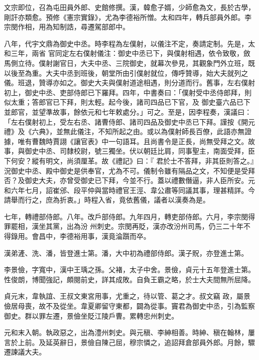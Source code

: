 \begin{pinyinscope}
 文宗即位，召為屯田員外郎、史館修撰。漢，韓愈子婿，少師愈為文，長於古學，剛訐亦類愈。預修《憲宗實錄》，尤為李德裕所憎。太和四年，轉兵部員外郎。李宗閔作相，用為知制誥，尋遷駕部郎中。



 八年，代宇文鼎為御史中丞。時李程為左僕射，以儀注不定，奏請定制。先是，太和三年，兩省
 官同定左右僕射儀注：御史中丞已下，與僕射相遇，依令致敬，斂馬側立待。僕射謝官日，大夫中丞、三院御史，就幕次參見，其觀象門外立班，既以後至為重。大夫中丞到班後，朝堂所由引僕射就位，傳呼贊導，始大夫就列之儀。班退，贊導亦如之。御史大夫與僕射道途相遇，則分道而行。舊事，左右僕射初上，御史中丞、吏部侍郎已下羅拜。四年，中書奏曰：「僕射受中丞侍郎拜，則似太重；答郎官已下拜，則太輕。起今後，諸司四品已下官，及
 御史臺六品已下並郎官，並望準故事，餘依元和七年敕處分。」可之。至是，因李程奏，漢議曰：「左右僕射初上，受左右丞、諸曹侍郎、諸司四品及御史中丞已下拜。謹按《開元禮》及《六典》，並無此儀注，不知所起之由。或以為僕射師長百僚，此語亦無證據，唯有曹魏時賈詡《讓官表》中一句語耳。且尚書令是正長，尚無受拜之文。故事，與御史中丞、司隸校尉，號三獨坐。伏以朝廷比肩，同事聖主，南面受拜，臣下何安？縱有明文，尚須厘革。故《禮記》曰：『
 君於士不答拜，非其臣則答之。』況御史中丞、殿中御史是供奉官，尤為不可。儀制令雖有隔品之文，不知便是受拜否？及御史大夫，亦曾受御史已下拜，今並不行。蓋以禮數僭逼，非人臣所安。元和六年七月，詔崔邠、段平仲與當時禮官王涇、韋公肅等同議其事，理甚精詳。今請舉而行之，庶為折衷。」時程入省，竟依舊儀，議者以漢奏為是。



 七年，轉禮部侍郎。八年。改戶部侍郎。九年四月，轉吏部侍郎。六月，李宗閔得罪罷相，漢坐其黨，出為汾
 州刺史。宗閔再貶，漢亦改汾州司馬，仍三二十年不得錄用。會昌中，李德裕用事，漢竟淪躓而卒。



 漢弟滻、洗、潘，皆登進士第。潘，大中初為禮部侍郎。漢子貺，亦登進士第。



 李景儉，字寬中，漢中王瑀之孫。父褚，太子中舍。景儉，貞元十五年登進士第。性俊朗，博聞強記，頗閱前史，詳其成敗。自負王霸之略，於士大夫間無所屈降。



 貞元末，韋執誼、王叔文東宮用事，尤重之，待以管、葛之才。叔文竊
 政，屬景儉居母喪，故不及從坐。韋夏卿留守東都，闢為從事。竇君為御史中丞，引為監察御史。群以罪左遷，景儉坐貶江陵戶曹。累轉忠州刺史。



 元和末入朝。執政惡之，出為澧州刺史。與元稹、李紳相善。時紳、稹在翰林，屢言於上前。及延英辭日，景儉自陳己屈，穆宗憐之，追詔拜倉部員外郎。月餘，驟遷諫議大夫。




\end{pinyinscope}
